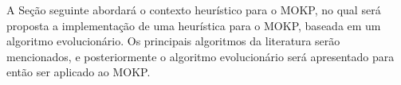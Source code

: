

A Seção seguinte abordará o contexto heurístico para o MOKP,
no qual será proposta a implementação de uma heurística para o MOKP, baseada
em um algoritmo evolucionário.
Os principais algoritmos da literatura serão mencionados, e posteriormente o
algoritmo evolucionário será apresentado para então ser aplicado ao MOKP.